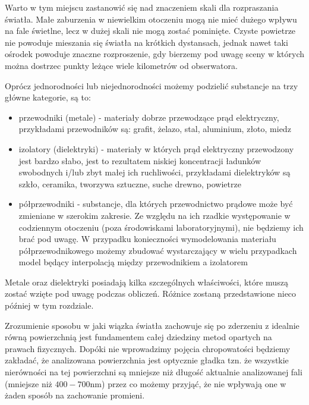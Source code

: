 \documentclass[../main.tex]{subfiles}
\begin{document}
Warto w tym miejscu zastanowić się nad znaczeniem skali dla rozpraszania światła. Małe zaburzenia w niewielkim otoczeniu mogą nie mieć dużego wpływu na fale świetlne, lecz w dużej skali nie mogą zostać pominięte. Czyste powietrze nie powoduje mieszania się światła na krótkich dystansach, jednak nawet taki ośrodek powoduje znaczne rozproszenie, gdy bierzemy pod uwagę sceny w których można dostrzec punkty leżące wiele kilometrów od obserwatora. 

Oprócz jednorodności lub niejednorodności możemy podzielić substancje na trzy główne kategorie, są to:

\begin{itemize}
	\item przewodniki (metale) - materiały dobrze przewodzące prąd elektryczny, przykładami przewodników są: grafit, żelazo, stal, aluminium, złoto, miedz
    
	\item izolatory (dielektryki) - materiały w których prąd elektryczny przewodzony jest bardzo słabo, jest to rezultatem niskiej koncentracji ładunków swobodnych i/lub zbyt małej ich ruchliwości, przykładami dielektryków są szkło, ceramika, tworzywa sztuczne, suche drewno, powietrze
	
	\item półprzewodniki - substancje, dla których przewodnictwo prądowe może być zmieniane w szerokim zakresie. Ze względu na ich rzadkie występowanie w codziennym otoczeniu (poza środowiskami laboratoryjnymi), nie będziemy ich brać pod uwagę. W przypadku konieczności wymodelowania materiału półprzewodnikowego możemy zbudować wystarczający w wielu przypadkach model będący interpolacją między przewodnikiem a izolatorem
\end{itemize}

Metale oraz dielektryki posiadają kilka szczególnych właściwości, które muszą zostać wzięte pod uwagę podczas obliczeń. Różnice zostaną przedstawione nieco później w tym rozdziale.

Zrozumienie sposobu w jaki wiązka światła zachowuje się po zderzeniu z idealnie równą powierzchnią jest fundamentem całej dziedziny metod opartych na prawach fizycznych. Dopóki nie wprowadzimy pojęcia chropowatości będziemy zakładać, że analizowana powierzchnia jest optycznie gładka tzn. że wszystkie nierówności na tej powierzchni są mniejsze niż długość aktualnie analizowanej fali (mniejsze niż $400-700$nm) przez co możemy przyjąć, że nie wpływają one w żaden sposób na zachowanie promieni.
\end{document}
